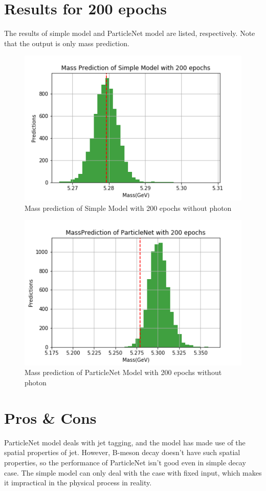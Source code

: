\documentclass[12pt]{article}
\numberwithin{equation}{section}
\begin{document}
\section{Results for 200 epochs}
The results of simple model and ParticleNet model are listed, respectively.
Note that the output is only mass prediction.
\begin{figure}[H]
    \centering
    \includegraphics[width=0.75\linewidth]{SM200epochsw0Photon.png}
    \caption{Mass prediction of Simple Model with 200 epochs without photon}
    \label{2}
\end{figure}
\begin{figure}[H]
    \centering
    \includegraphics[width=0.75\linewidth]{PN200epochsw0Photon.png}
    \caption{Mass prediction of ParticleNet Model with 200 epochs without photon}
    \label{3}
\end{figure}
\section{Pros \& Cons}
ParticleNet model deals with jet tagging, and the model has made use of the spatial properties of jet.
However, B-meson decay doesn't have such spatial properties, so the performance of ParticleNet isn't good even in simple decay case.
The simple model can only deal with the case with fixed input, which makes it impractical in the physical process in reality.
\end{document}
